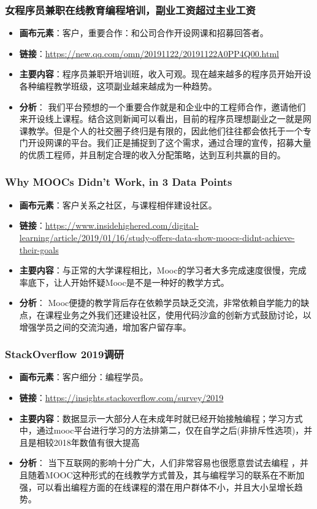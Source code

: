 \documentclass[a4paper]{ctexart}
\begin{document}
\subsubsection{女程序员兼职在线教育编程培训，副业工资超过主业工资}
\begin{itemize}
  \item \textbf{画布元素}：客户，重要合作：和公司合作开设网课和招募回答者。
  \item \textbf{链接}：\url{https://new.qq.com/omn/20191122/20191122A0PP4Q00.html}
  \item \textbf{主要内容}：程序员兼职开培训班，收入可观。现在越来越多的程序员开始开设各种编程教学班级，这项副业越来越成为一种趋势。
  \item \textbf{分析}：  我们平台预想的一个重要合作就是和企业中的工程师合作，邀请他们来开设线上课程。结合这则新闻可以看出，目前的程序员理想副业之一就是网课教学。但是个人的社交圈子终归是有限的，因此他们往往都会依托于一个专门开设网课的平台。我们正是捕捉到了这个需求，通过合理的宣传，招募大量的优质工程师，并且制定合理的收入分配策略，达到互利共赢的目的。
\end{itemize}

\subsubsection{Why MOOCs Didn't Work, in 3 Data Points}
\begin{itemize}
  \item \textbf{画布元素}：客户关系之社区，与课程相伴建设社区。
  \item \textbf{链接}：\url{https://www.insidehighered.com/digital-learning/article/2019/01/16/study-offers-data-show-moocs-didnt-achieve-their-goals}
  \item \textbf{主要内容}：与正常的大学课程相比，Mooc的学习者大多完成速度很慢，完成率底下，让人开始怀疑Mooc是不是一种好的教学方式。
  \item \textbf{分析}：  Mooc便捷的教学背后存在依赖学员缺乏交流，非常依赖自学能力的缺点，在课程业务之外我们还建设社区，使用代码沙盒的创新方式鼓励讨论，以增强学员之间的交流沟通，增加客户留存率。
\end{itemize}

\subsubsection{StackOverflow 2019调研}
\begin{itemize}
  \item \textbf{画布元素}：客户细分：编程学员。
  \item \textbf{链接}：\url{https://insights.stackoverflow.com/survey/2019}
  \item \textbf{主要内容}：数据显示一大部分人在未成年时就已经开始接触编程；学习方式中，通过mooc平台进行学习的方法排第二，仅在自学之后(非排斥性选项)，并且是相较2018年数值有很大提高
  \item \textbf{分析}：
  当下互联网的影响十分广大，人们非常容易也很愿意尝试去编程 ，并且随着MOOC这种形式的在线教学方式普及，其与编程学习的联系在不断加强，可以看出编程方面的在线课程的潜在用户群体不小，并且大小呈增长趋势。
\end{itemize}
\end{document}
